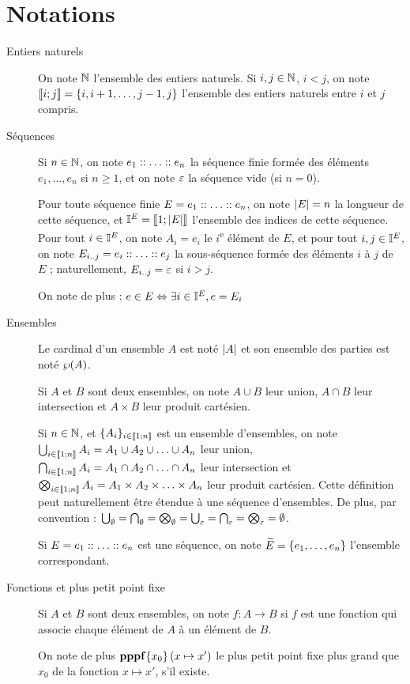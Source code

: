 \section{Notations}

\begin{description}
  \item[Entiers naturels]
    On note $\mathbb{N}$ l'ensemble des entiers naturels.
    Si $i, j \in \mathbb{N}$, $i < j$, on note $\llbracket i; j \rrbracket = \{ i, i+1, \ldots, j-1, j \}$
    l'ensemble des entiers naturels entre $i$ et $j$ compris.
  
  \item[Séquences]
    Si $n \in \mathbb{N}$, on note $e_1 :: \ldots :: e_n$ la séquence finie formée
    des éléments $e_1, \ldots, e_n$ si $n \geq 1$,
    et on note $\varepsilon$ la séquence vide (si $n = 0$).
    
    Pour toute séquence finie $E = e_1 :: \ldots :: e_n$,
    on note $|E| = n$ la longueur de cette séquence,
    et $\mathbb{I}^{E} = \llbracket 1; |E| \rrbracket$ l'ensemble des indices de cette séquence.
    Pour tout $i \in \mathbb{I}^{E}$, on note $A_i = e_i$ le $i$\textsuperscript{e} élément de $E$,
    et pour tout $i,j \in \mathbb{I}^{E}$, on note $E_{i..j} = e_i :: \ldots :: e_j$
    la sous-séquence formée des éléments $i$ à $j$ de $E$ ;
    naturellement, $E_{i..j} = \varepsilon$ si $i > j$.
    
    On note de plus : $e \in E \Leftrightarrow \exists i \in \mathbb{I}^{E}, e = E_i$
  
  \item[Ensembles]
    Le cardinal d'un ensemble $A$ est noté $|A|$
    et son ensemble des parties est noté $\wp(A)$.
    
    Si $A$ et $B$ sont deux ensembles, on note
    $A \cup B$ leur union, $A \cap B$ leur intersection et $A \times B$ leur produit cartésien.
    
    Si $n \in \mathbb{N}$, et $\{ A_i \}_{i \in \llbracket 1; n \rrbracket}$ est un ensemble d'ensembles, on note
    $\bigcup_{i \in \llbracket 1; n \rrbracket} A_i = A_1 \cup A_2 \cup \ldots \cup A_n$ leur union,
    $\bigcap_{i \in \llbracket 1; n \rrbracket} A_i = A_1 \cap A_2 \cap \ldots \cap A_n$ leur intersection et
    $\bigotimes_{i \in \llbracket 1; n \rrbracket} A_i = A_1 \times A_2 \times \ldots \times A_n$
    leur produit cartésien.
    Cette définition peut naturellement être étendue à une séquence d'ensembles.
    De plus, par convention :
    $\bigcup_{\emptyset} = \bigcap_{\emptyset} = \bigotimes_{\emptyset} =
      \bigcup_{\varepsilon} = \bigcap_{\varepsilon} = \bigotimes_{\varepsilon} = \emptyset$.
    
    Si $E = e_1 :: \ldots :: e_n$ est une séquence,
    on note $\widetilde{E} = \{ e_1, \ldots, e_n \}$ l'ensemble correspondant.
  
  \item[Fonctions et plus petit point fixe]
    Si $A$ et $B$ sont deux ensembles,
    on note $f : A \rightarrow B$
    si $f$ est une fonction qui associe chaque élément de $A$ à un élément de $B$.
    
    On note de plus $\mathbf{pppf}\{x_0\}\left(x\mapsto x'\right)$ le plus petit point fixe plus grand que $x_0$
    de la fonction $x \mapsto x'$, s'il existe.
\end{description}

